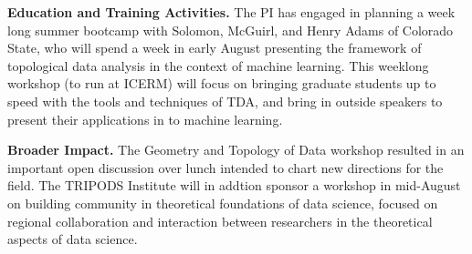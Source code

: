 {\bf Education and Training Activities.}
The PI has engaged in planning a week long summer bootcamp with Solomon, McGuirl, and Henry Adams of Colorado State, who will spend a week in early August presenting the framework of topological data analysis in the context of machine learning. This weeklong workshop (to run at ICERM) will focus on bringing graduate students up to speed with the tools and techniques of TDA, and bring in outside speakers to present their applications in to machine learning.

{\bf Broader Impact.} The Geometry and Topology of Data workshop resulted in an important open discussion over lunch intended to chart new directions for the field. The TRIPODS Institute will in addtion sponsor a workshop in mid-August on building community in theoretical foundations of data science, focused on regional collaboration and interaction between researchers in the theoretical aspects of data science.
